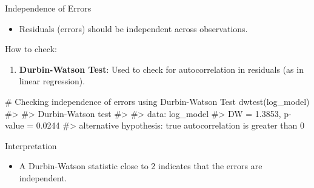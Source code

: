 \documentclass[
  18 pt,
  ignorenonframetext,
  aspectratio=1610,
]{beamer}
\newenvironment{Shaded}{\begin{snugshade}}{\end{snugshade}}
\newcommand{\CommentTok}[1]{\textcolor[rgb]{0.37,0.37,0.37}{#1}}
\newcommand{\FunctionTok}[1]{\textcolor[rgb]{0.28,0.35,0.67}{#1}}
\newcommand{\NormalTok}[1]{\textcolor[rgb]{0.00,0.23,0.31}{#1}}
\providecommand{\tightlist}{%
  \setlength{\itemsep}{0pt}\setlength{\parskip}{0pt}}\usepackage{longtable,booktabs,array}
\begin{document}
\begin{frame}[fragile]{Independence of Errors}
\protect\hypertarget{independence-of-errors}{}
\begin{itemize}
\tightlist
\item
  Residuals (errors) should be independent across observations.
\end{itemize}

\begin{block}{How to check:}
\protect\hypertarget{how-to-check-5}{}
\begin{enumerate}
\tightlist
\item
  \textbf{Durbin-Watson Test}: Used to check for autocorrelation in
  residuals (as in linear regression).
\end{enumerate}

\begin{Shaded}
\begin{Highlighting}[]
\CommentTok{\# Checking independence of errors using Durbin{-}Watson Test}
\FunctionTok{dwtest}\NormalTok{(log\_model)}
\CommentTok{\#\textgreater{} }
\CommentTok{\#\textgreater{}  Durbin{-}Watson test}
\CommentTok{\#\textgreater{} }
\CommentTok{\#\textgreater{} data:  log\_model}
\CommentTok{\#\textgreater{} DW = 1.3853, p{-}value = 0.0244}
\CommentTok{\#\textgreater{} alternative hypothesis: true autocorrelation is greater than 0}
\end{Highlighting}
\end{Shaded}
\end{block}

\begin{block}{Interpretation}
\protect\hypertarget{interpretation-9}{}
\begin{itemize}
\tightlist
\item
  A Durbin-Watson statistic close to 2 indicates that the errors are
  independent.
\end{itemize}
\end{block}
\end{frame}
\end{document}

